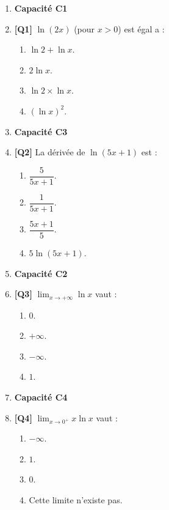 \begin{enumerate}

\item[] \textbf{Capacité C1}

\item \textbf{[Q1]} $\ln(2x)$ (pour $x>0$) est égal a :
  \begin{enumerate}[label=\Alph*.]
    \item $\ln 2 + \ln x$.
    \item $2\ln x$.
    \item $\ln 2 \times \ln x$.
    \item $(\ln x)^2$.
  \end{enumerate}

\item[] \textbf{Capacité C3}

\item \textbf{[Q2]} La dérivée de $\ln(5x+1)$ est :
  \begin{enumerate}[label=\Alph*.]
    \item $\dfrac{5}{5x+1}$.
    \item $\dfrac{1}{5x+1}$.
    \item $\dfrac{5x+1}{5}$.
    \item $5\ln(5x+1)$.
  \end{enumerate}

\item[] \textbf{Capacité C2}

\item \textbf{[Q3]} $\displaystyle\lim_{x \to +\infty} \ln x$ vaut :
  \begin{enumerate}[label=\Alph*.]
    \item $0$.
    \item $+\infty$.
    \item $-\infty$.
    \item $1$.
  \end{enumerate}

\item[] \textbf{Capacité C4}

\item \textbf{[Q4]} $\displaystyle\lim_{x \to 0^+} x\ln x$ vaut :
  \begin{enumerate}[label=\Alph*.]
    \item $-\infty$.
    \item $1$.
    \item $0$.
    \item Cette limite n'existe pas.
  \end{enumerate}


\end{enumerate}
